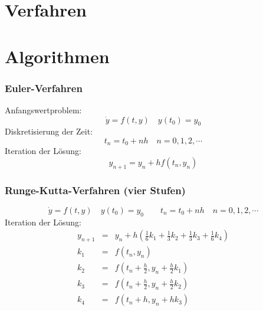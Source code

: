 \documentclass{beamer}
\begin{document}
\section{Verfahren}

\section{Algorithmen}
\frame
{
  \frametitle{Euler-Verfahren}
Anfangswertproblem:
\begin{equation}
 \dot y = f\left(t,y\right)\quad y\left(t_0\right)=y_0\nonumber
\end{equation}
Diskretisierung der Zeit:
\begin{equation}
 t_n = t_0 + n h \quad n=0,1,2,\cdots\nonumber
\end{equation}
Iteration der Lösung:
\begin{equation}
 y_{n+1} = y_n + h f \left(t_n,y_n\right)\nonumber
\end{equation}
}

\frame
{
  \frametitle{Runge-Kutta-Verfahren (vier Stufen)}
\begin{equation}
 \dot y = f\left(t,y\right)\quad y\left(t_0\right)=y_0\quad\quad t_n = t_0 + n h \quad n=0,1,2,\cdots\nonumber
\end{equation}
Iteration der Lösung:
\begin{eqnarray}
 y_{n+1} &=& y_n + h \left(\frac{1}{6} k_1+\frac{1}{3} k_2+\frac{1}{3} k_3+\frac{1}{6} k_4\right)\nonumber\\
 k_1 &=& f \left(t_n,y_n\right)\nonumber\\
 k_2 &=& f \left(t_n+\frac{h}{2},y_n+\frac{h}{2} k_1\right)\nonumber\\
 k_3 &=& f \left(t_n+\frac{h}{2},y_n+\frac{h}{2} k_2\right)\nonumber\\
 k_4 &=& f \left(t_n+h,y_n+h k_3\right)\nonumber
\end{eqnarray}
}
\end{document}

